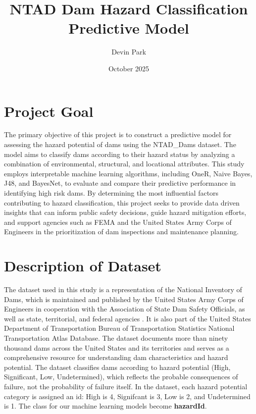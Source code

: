 \documentclass{article}
\title{NTAD Dam Hazard Classification Predictive Model}
\author{Devin Park}
\date{October 2025}
\begin{document}
\maketitle
\newpage
\tableofcontents
\newpage


\section{Project Goal}
The primary objective of this project is to construct a predictive model for assessing the hazard potential of dams using the NTAD\_Dams dataset. The model aims to classify dams according to their hazard status by analyzing a combination of environmental, structural, and locational attributes. This study employs interpretable machine learning algorithms, including OneR, Naive Bayes, J48, and BayesNet, to evaluate and compare their predictive performance in identifying high risk dams. By determining the most influential factors contributing to hazard classification, this project seeks to provide data driven insights that can inform public safety decisions, guide hazard mitigation efforts, and support agencies such as FEMA and the United States Army Corps of Engineers in the prioritization of dam inspections and maintenance planning.



\section{Description of Dataset}\label{sec:Description of Dataset}
The dataset used in this study is a representation of the National Inventory of Dams, which is maintained and published by the United States Army Corps of Engineers in cooperation with the Association of State Dam Safety Officials, as well as state, territorial, and federal agencies \cite{USDOT_Dams_NTAD}. 
It is also part of the United States Department of Transportation Bureau of Transportation Statistics National Transportation Atlas Database. 
The dataset documents more than ninety thousand dams across the United States and its territories and serves as a comprehensive resource for understanding dam characteristics and hazard potential. 
The dataset classifies dams according to hazard potential (High, Significant, Low, Undetermined), which reflects the probable consequences of failure, not the probability of failure itself.
In the dataset, each hazard potential category is assigned an id: High is 4, Signifcant is 3, Low is 2, and Undetermined is 1. The class for our machine learning models become \textbf{hazardId}.
\end{document}
